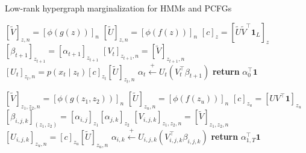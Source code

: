 \documentclass{article}
\begin{document}
\begin{algorithm}[t]
\caption{Low-rank hypergraph marginalization for HMMs and PCFGs}
\label{alg:lr-marg-hmm-pcfg}
\begin{minipage}[t]{0.45\textwidth}
\begin{algorithmic}
\STATE $[\tilde{V}]_{z,n} = [\phi(g(z))]_n$
\STATE $[\tilde{U}]_{z,n} = [\phi(f(z))]_n$
\STATE $[c]_z = [\tilde{U}\tilde{V}^\top\mathbf{1}_L]_z$
\STATE $[\beta_{t+1}]_{z_{t+1}} = [\alpha_{t+1}]_{z_{t+1}}$
\STATE $[V_t]_{z_{t+1},n} = [\tilde{V}]_{z_{t+1},n}$
\STATE $[U_t]_{z_t,n} = p(x_t \mid z_t)[c]_{z_{t}}[\tilde{U}]_{z_t,n}$
\STATE $\alpha_t \stackrel{+}{\gets} U_t(V_t^\top\beta_{t+1})$
\ENDFOR
\STATE \textbf{return} $\alpha_0^\top \mathbf{1}$
\end{algorithmic}
\end{minipage}
\vspace{0pt}
\begin{minipage}[t]{0.50\textwidth}
\begin{algorithmic} 
\STATE $[\tilde{V}]_{z_1,z_2,n} = [\phi(g(z_1,z_2))]_n$
\STATE $[\tilde{U}]_{z_u,n} = [\phi(f(z_u))]_n$
\STATE $[c]_{z_u} = [UV^\top\mathbf{1}]_{z_u}$
\STATE $[\beta_{i,j,k}]_{(z_1,z_2)} = [\alpha_{i,j}]_{z_1}[\alpha_{j,k}]_{z_2}$
\STATE $[V_{i,j,k}]_{z_1,z_2,n} = [\tilde{V}]_{z_1,z_2,n}$
\STATE $[U_{i,j,k}]_{z_u,n} = [c]_{z_u}[\tilde{U}]_{z_u,n}$
\STATE $\alpha_{i,k} \stackrel{+}{\gets} U_{i,j,k}(V_{i,j,k}^\top\beta_{i,j,k})$
\ENDFOR
\STATE \textbf{return} $\alpha_{1,T}^\top \mathbf{1}$
\end{algorithmic}
\end{minipage}
\end{algorithm}
\end{document}
